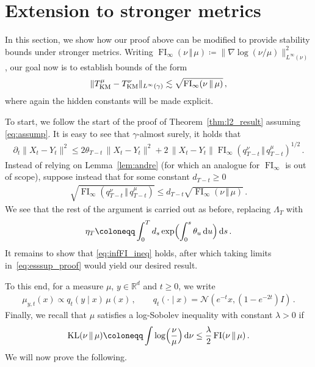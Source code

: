 \documentclass[12pt]{article}
\newcommand{\cN}{\mathcal{N}}
\newcommand{\RR}{\mathbb{R}}
\newcommand{\R}{\RR}
\newcommand{\1}{\mathds{1}}
\newcommand*{\defeq}{\coloneqq}
\newcommand*{\rd}{\mathrm{d}}
\newcommand*{\dd}{\, \rd}
\newcommand{\mmid}{\,\Vert\,}
\def\defeq{\coloneqq} %
\newcommand{\infFI}{\operatorname{FI}_\infty}
\theoremstyle{plain}
\theoremstyle{definition}
\theoremstyle{remark}
\begin{document}
\section{Extension to stronger metrics}
In this section, we show how our proof above can be modified to provide stability bounds under stronger metrics. Writing $\infFI(\nu\mmid\mu) \defeq {\|\nabla\log(\nu/\mu)\|_{L^\infty(\nu)}^2}$, our goal now is to establish bounds of the form
\begin{align}\label{eq:esssup_result}
    \|T^\mu_{\rm KM} - T^\nu_{\rm KM}\|_{L^\infty(\gamma)} \lesssim \sqrt{\infFI(\nu\mmid\mu)}\,,
\end{align}
where again the hidden constants will be made explicit.

To start, we follow the start of the proof of Theorem~\ref{thm:l2_result} assuming \eqref{eq:assump}. It is easy to see that $\gamma$-almost surely, it holds that
\begin{align*}
    \partial_t \|X_t - Y_t\|^2 \leq 2\theta_{T - t}\,\|X_t - Y_t\|^2 + 2\,\|X_t - Y_t\|\infFI(q_{T-t}^\nu\mmid q_{T-t}^\mu)^{1/2}\,.
\end{align*}
Instead of relying on Lemma~\ref{lem:andre} (for which an analogue for $\infFI$ is out of scope), suppose instead that for some constant $d_{T-t} \geq 0$
\begin{align}\label{eq:infFI_ineq}
    \sqrt{\infFI(q_{T-t}^\nu\mmid q_{T-t}^\mu)} \leq d_{T-t}\sqrt{\infFI(\nu\mmid \mu)}\,.
\end{align}
{We see that the rest of the argument is carried out as before, replacing $\Lambda_T$ with}
\begin{align}\label{eq:esssup_proof}
    {\eta_T \defeq} \int_0^T d_{s}\exp\Bigl(\int_0^{{s}}\theta_u \dd u \Bigr)\dd s\,.
\end{align}
It remains to show that \eqref{eq:infFI_ineq} holds, after which taking limits in~\eqref{eq:esssup_proof} would yield our desired result.

To this end, {for a measure $\mu$,} $y \in \R^d$ and $t \geq 0$, we write
\begin{align*}
    \mu_{y,t}(x) \propto q_t(y\mid x)\,\mu(x)\,,\qquad q_t(\cdot\mid x) = \cN(e^{-t}x, (1-e^{-2t})I)\,.
\end{align*}
Finally, we recall that $\mu$ satisfies a log-Sobolev inequality with constant $\lambda>0$ if
\begin{align*}
    {\rm KL}(\nu\mmid\mu) \defeq \int {\log \Bigl(\frac{\nu}{\mu}\Bigr)\dd\nu} \leq \frac{\lambda}{2}\,{\rm FI}(\nu\mmid\mu)\,.
\end{align*}
We will now prove the following.
\end{document}
